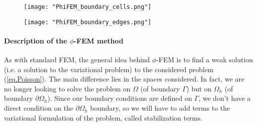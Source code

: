 \begin{minipage}{0.48\linewidth}
	\begin{figure}[H]
		\centering
		\texttt{[image: "PhiFEM\_boundary\_cells.png"]}
		\label{space4}
	\end{figure}
\end{minipage} \;
\begin{minipage}{0.48\linewidth}
	\begin{figure}[H]
		\centering
		\texttt{[image: "PhiFEM\_boundary\_edges.png"]}
		\label{space5}
	\end{figure}
\end{minipage}

\paragraph{Description of the $\phi$-FEM method} \label{FEMs.PhiFEM.Pres.method}

As with standard FEM, the general idea behind $\phi$-FEM is to find a weak solution (i.e. a solution to the variational problem) to the considered problem (\ref{eq.Poisson}). The main difference lies in the spaces considered. In fact, we are no longer looking to solve the problem on $\Omega$ (of boundary $\Gamma$) but on $\Omega_h$ (of boundary $\partial\Omega_h$). Since our boundary conditions are defined on $\Gamma$, we don't have a direct condition on the $\partial\Omega_h$ boundary, so we will have to add terms to the variational formulation of the problem, called stabilization terms.

